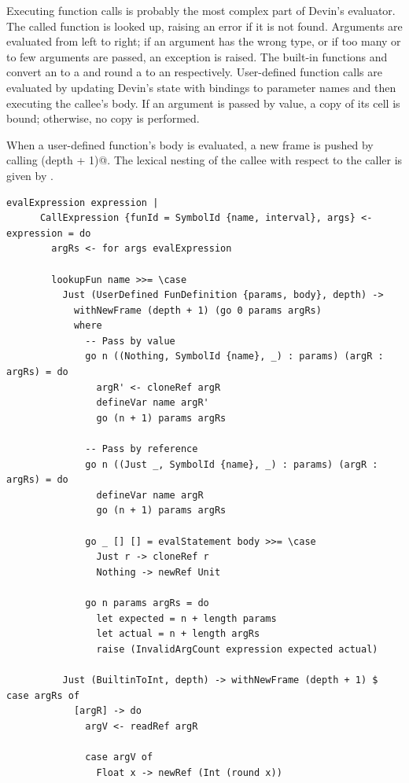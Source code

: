 \documentclass[UdineBachThesis,american,11pt]{PhdThesis}
\begin{document}
  Executing function calls is probably the most complex part of Devin's
  evaluator. The called function is looked up, raising an error if it is not
  found. Arguments are evaluated from left to right; if an argument has the
  wrong type, or if too many or to few arguments are passed, an exception is
  raised. The built-in functions \lstinline@toFloat@ and \lstinline@toInt@
  convert an \lstinline@Int@ to a \lstinline@Float@ and round a
  \lstinline@Float@ to an \lstinline@Int@ respectively. User-defined function
  calls are evaluated by updating Devin's state with bindings to parameter names
  and then executing the callee's body. If an argument is passed by value, a
  copy of its cell is bound; otherwise, no copy is performed.

  When a user-defined function's body is evaluated, a new frame is pushed by
  calling \lstinline@withNewFrame (depth + 1)@. The lexical nesting of the
  callee with respect to the caller is given by \lstinline@depth@.

  \begin{lstlisting}[gobble=4,basicstyle=\ttfamily\small]
    evalExpression expression |
      CallExpression {funId = SymbolId {name, interval}, args} <- expression = do
        argRs <- for args evalExpression

        lookupFun name >>= \case
          Just (UserDefined FunDefinition {params, body}, depth) ->
            withNewFrame (depth + 1) (go 0 params argRs)
            where
              -- Pass by value
              go n ((Nothing, SymbolId {name}, _) : params) (argR : argRs) = do
                argR' <- cloneRef argR
                defineVar name argR'
                go (n + 1) params argRs

              -- Pass by reference
              go n ((Just _, SymbolId {name}, _) : params) (argR : argRs) = do
                defineVar name argR
                go (n + 1) params argRs

              go _ [] [] = evalStatement body >>= \case
                Just r -> cloneRef r
                Nothing -> newRef Unit

              go n params argRs = do
                let expected = n + length params
                let actual = n + length argRs
                raise (InvalidArgCount expression expected actual)

          Just (BuiltinToInt, depth) -> withNewFrame (depth + 1) $ case argRs of
            [argR] -> do
              argV <- readRef argR

              case argV of
                Float x -> newRef (Int (round x))
  \end{lstlisting}
\end{document}
